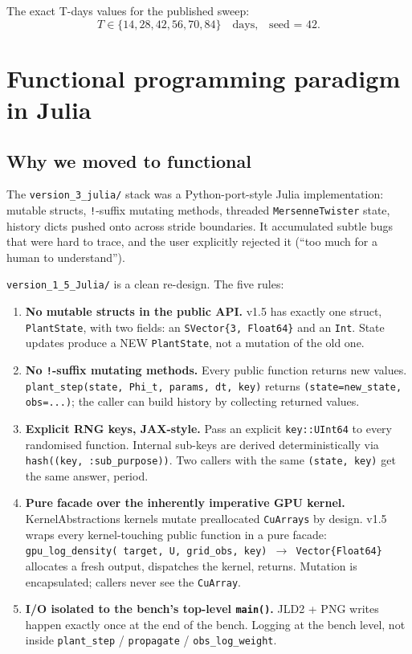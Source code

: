 \documentclass[11pt,a4paper]{article}
\begin{document}
The exact T-days values for the published sweep:
\[ T \in \{14, 28, 42, 56, 70, 84\} \quad \text{days,} \quad \text{seed = 42}. \]


\section{Functional programming paradigm in Julia}
\label{sec:functional}

\subsection{Why we moved to functional}

The \texttt{version\_3\_julia/} stack was a Python-port-style Julia
implementation: mutable structs, \texttt{!}-suffix mutating methods,
threaded \texttt{MersenneTwister} state, history dicts pushed onto
across stride boundaries. It accumulated subtle bugs that were hard
to trace, and the user explicitly rejected it (``too much for a
human to understand'').

\texttt{version\_1\_5\_Julia/} is a clean re-design. The five rules:

\begin{enumerate}[itemsep=2pt]
  \item \textbf{No mutable structs in the public API.} v1.5 has
        exactly one struct, \texttt{PlantState}, with two fields:
        an \texttt{SVector\{3, Float64\}} and an \texttt{Int}. State
        updates produce a NEW \texttt{PlantState}, not a mutation
        of the old one.
  \item \textbf{No \texttt{!}-suffix mutating methods.} Every public
        function returns new values. \texttt{plant\_step(state,
        Phi\_t, params, dt, key)} returns
        \texttt{(state=new\_state, obs=...)}; the caller can build
        history by collecting returned values.
  \item \textbf{Explicit RNG keys, JAX-style.} Pass an explicit
        \texttt{key::UInt64} to every randomised function. Internal
        sub-keys are derived deterministically via
        \texttt{hash((key, :sub\_purpose))}. Two callers with the
        same \texttt{(state, key)} get the same answer, period.
  \item \textbf{Pure facade over the inherently imperative GPU
        kernel.} KernelAbstractions kernels mutate preallocated
        \texttt{CuArrays} by design. v1.5 wraps every kernel-touching
        public function in a pure facade: \texttt{gpu\_log\_density(
        target, U, grid\_obs, key) $\to$ Vector\{Float64\}} allocates
        a fresh output, dispatches the kernel, returns. Mutation is
        encapsulated; callers never see the \texttt{CuArray}.
  \item \textbf{I/O isolated to the bench's top-level
        \texttt{main()}.} JLD2 + PNG writes happen exactly once at
        the end of the bench. Logging at the bench level, not inside
        \texttt{plant\_step} / \texttt{propagate} /
        \texttt{obs\_log\_weight}.
\end{enumerate}
\end{document}

